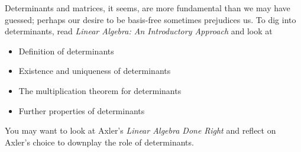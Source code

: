 \documentclass{homework}
\begin{document}
Determinants and matrices, it seems, are more fundamental than we may
have guessed; perhaps our desire to be basis-free sometimes prejudices
us.  To dig into determinants, read \textit{Linear Algebra: An
  Introductory Approach} and look at
\begin{itemize}
\item {} Definition of determinants
\item {} Existence and uniqueness of determinants
\item {} The multiplication theorem for determinants
\item {} Further properties of determinants
\end{itemize}
You may want to look at Axler's \textit{Linear Algebra Done Right} and
reflect on Axler's choice to downplay the role of determinants.
\end{document}
